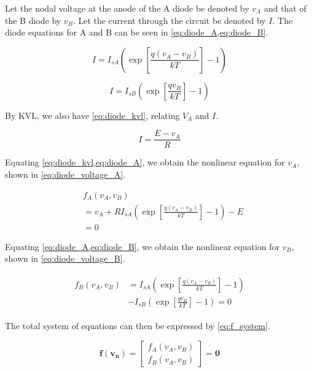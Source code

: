 \documentclass[a4paper,titlepage]{article}
\begin{document}
	Let the nodal voltage at the anode of the A diode be denoted by $v_A$ and that of the B diode by $v_B$. Let the current through the circuit be denoted by $I$. The diode equations for A and B can be seen in \cref{eq:diode_A,eq:diode_B}.
	
	\begin{equation} \label{eq:diode_A}
		I = I_{sA} \left( \exp\left[{\frac{q(v_A - v_B)}{kT}}\right] - 1\right)
	\end{equation}
	
	\begin{equation} \label{eq:diode_B}
		I = I_{sB} \left( \exp\left[{\frac{qv_B}{kT}}\right] - 1\right)
	\end{equation}
	
	By KVL, we also have \cref{eq:diode_kvl}, relating $V_A$ and $I$.
	
	\begin{equation} \label{eq:diode_kvl}
		I = \frac{E - v_A}{R}
	\end{equation}
	
	Equating \cref{eq:diode_kvl,eq:diode_A}, we obtain the nonlinear equation for $v_A$, shown in \cref{eq:diode_voltage_A}.
	
	\begin{equation} \label{eq:diode_voltage_A}
	\begin{split}
		&f_A(v_A, v_B) \\
		& = v_A + R I_{sA} \left( \exp\left[{\frac{q(v_A - v_B)}{kT}}\right] - 1\right) - E \\
		& = 0
	\end{split}
	\end{equation}
	
	Equating \cref{eq:diode_A,eq:diode_B}, we obtain the nonlinear equation for $v_B$, shown in \cref{eq:diode_voltage_B}.
	
	\begin{align} \label{eq:diode_voltage_B}
	\begin{split}
		f_B(v_A, v_B) &= I_{sA} \left( \exp\left[{\frac{q(v_A - v_B)}{kT}}\right] - 1\right)\\
		&- I_{sB} \left( \exp\left[{\frac{qv_B}{kT}}\right] - 1\right) = 0
	\end{split}
	\end{align}
	
	The total system of equations can then be expressed by \cref{eq:f_system}.
	
	\begin{equation} \label{eq:f_system}
		\mathbf{f}(\mathbf{v_n}) = 
		\begin{bmatrix}
		f_A(v_A, v_B) \\
		f_B(v_A, v_B)
		\end{bmatrix}
		= \mathbf{0}
	\end{equation}
	
\end{document}
